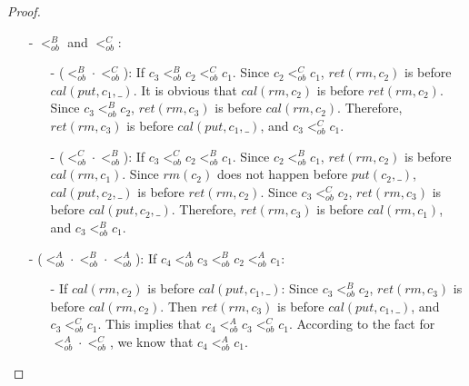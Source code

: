 \begin {proof}
\begin{itemize}
\begin{itemize}
    \item[-] ($<_{\textit{ob}}^C \cdot <_{\textit{ob}}^A$): If $c_3 <_{\textit{ob}}^C c_2 <_{\textit{ob}}^A c_1$. Since $c_2 <_{\textit{ob}}^A c_1$, $\textit{put}(c_2,\_)$ happens before $\textit{put}(c_1,\_)$. Since $c_3 <_{\textit{ob}}^C c_2$, $\textit{rm}(c_3)$ happens before $\textit{put}(c_2,\_)$. Therefore, $\textit{rm}(c_3)$ happens before $\textit{put}(c_1,\_)$, and $c_3 <_{\textit{ob}}^C c_1$.
    \end{itemize}

\item[-] $<_{\textit{ob}}^B$ and $<_{\textit{ob}}^C$:

    \begin{itemize}
    \setlength{\itemsep}{0.5pt}
    \item[-] ($<_{\textit{ob}}^B \cdot <_{\textit{ob}}^C$): If $c_3 <_{\textit{ob}}^B c_2 <_{\textit{ob}}^C c_1$. Since $c_2 <_{\textit{ob}}^C c_1$, $\textit{ret}(\textit{rm},c_2)$ is before $\textit{cal}(\textit{put},c_1,\_)$. It is obvious that $\textit{cal}(\textit{rm},c_2)$ is before $\textit{ret}(\textit{rm},c_2)$. Since $c_3 <_{\textit{ob}}^B c_2$, $\textit{ret}(\textit{rm},c_3)$ is before $\textit{cal}(\textit{rm},c_2)$. Therefore, $\textit{ret}(\textit{rm},c_3)$ is before $\textit{cal}(\textit{put},c_1,\_)$, and $c_3 <_{\textit{ob}}^C c_1$.

    \item[-] ($<_{\textit{ob}}^C \cdot <_{\textit{ob}}^B$): If $c_3 <_{\textit{ob}}^C c_2 <_{\textit{ob}}^B c_1$. Since $c_2 <_{\textit{ob}}^B c_1$, $\textit{ret}(\textit{rm},c_2)$ is before $\textit{cal}(\textit{rm},c_1)$. Since $\textit{rm}(c_2)$ does not happen before $\textit{put}(c_2,\_)$, $\textit{cal}(\textit{put},c_2,\_)$ is before $\textit{ret}(\textit{rm},c_2)$. Since $c_3 <_{\textit{ob}}^C c_2$, $\textit{ret}(\textit{rm},c_3)$ is before $\textit{cal}(\textit{put},c_2,\_)$. Therefore, $\textit{ret}(\textit{rm},c_3)$ is before $\textit{cal}(\textit{rm},c_1)$, and $c_3 <_{\textit{ob}}^B c_1$.
    \end{itemize}

\item[-]  ($<_{\textit{ob}}^A \cdot <_{\textit{ob}}^B \cdot <_{\textit{ob}}^A$): If $c_4 <_{\textit{ob}}^A c_3 <_{\textit{ob}}^B c_2 <_{\textit{ob}}^A c_1$:
    \begin{itemize}
    \setlength{\itemsep}{0.5pt}
    \item[-] If $\textit{cal}(\textit{rm},c_2)$ is before $\textit{cal}(\textit{put},c_1,\_)$: Since $c_3 <_{\textit{ob}}^B c_2$, $\textit{ret}(\textit{rm},c_3)$ is before $\textit{cal}(\textit{rm},c_2)$. Then $\textit{ret}(\textit{rm},c_3)$ is before $\textit{cal}(\textit{put},c_1,\_)$, and $c_3 <_{\textit{ob}}^C c_1$. This implies that $c_4 <_{\textit{ob}}^A c_3 <_{\textit{ob}}^C c_1$. According to the fact for $<_{\textit{ob}}^A \cdot <_{\textit{ob}}^C$, we know that $c_4  <_{\textit{ob}}^A c_1$.


\end{itemize}
\end{itemize}
\end{proof}
